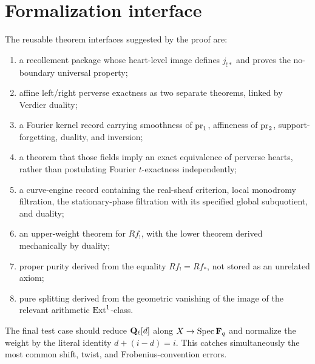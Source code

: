 \section{Formalization interface}

\begin{formalization}
The reusable theorem interfaces suggested by the proof are:
\begin{enumerate}
\item a recollement package whose heart-level image defines \(j_{!*}\) and
      proves the no-boundary universal property;
\item affine left/right perverse exactness as two separate theorems, linked
      by Verdier duality;
\item a Fourier kernel record carrying smoothness of \(\operatorname{pr}_1\), affineness
      of \(\operatorname{pr}_2\), support-forgetting, duality, and inversion;
\item a theorem that those fields imply an exact equivalence of perverse
      hearts, rather than postulating Fourier \(t\)-exactness independently;
\item a curve-engine record containing the real-sheaf criterion, local
      monodromy filtration, the stationary-phase filtration with its specified
      global subquotient, and duality;
\item an upper-weight theorem for \(Rf_!\), with the lower theorem derived
      mechanically by duality;
\item proper purity derived from the equality \(Rf_!=Rf_*\), not stored as
      an unrelated axiom;
\item pure splitting derived from the geometric vanishing of the image of
      the relevant arithmetic \(\operatorname{Ext}^1\)-class.
\end{enumerate}
The final test case should reduce
\(\mathbf Q_\ell[d]\) along \(X\to\operatorname{Spec}\mathbf F_q\) and normalize the weight by the literal
identity \(d+(i-d)=i\).  This catches simultaneously the most common shift,
twist, and Frobenius-convention errors.
\end{formalization}

